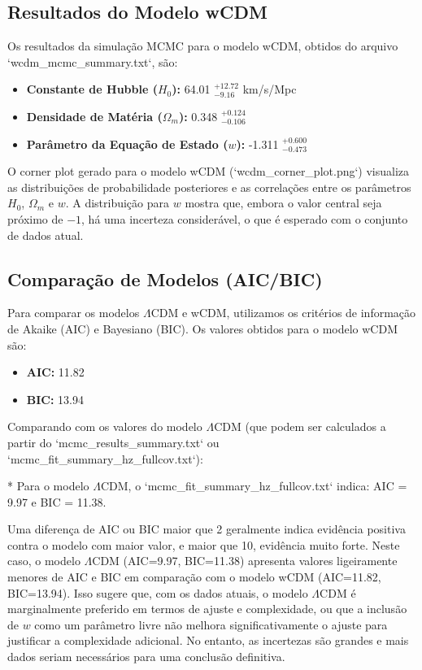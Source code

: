 \documentclass{article}
\begin{document}
\subsection{Resultados do Modelo wCDM}

Os resultados da simulação MCMC para o modelo wCDM, obtidos do arquivo `wcdm_mcmc_summary.txt`, são:

\begin{itemize}
    \item \textbf{Constante de Hubble ($H_0$):} 64.01 $^{+12.72}_{-9.16}$ km/s/Mpc
    \item \textbf{Densidade de Matéria ($\Omega_m$):} 0.348 $^{+0.124}_{-0.106}$
    \item \textbf{Parâmetro da Equação de Estado ($w$):} -1.311 $^{+0.600}_{-0.473}$
\end{itemize}

O corner plot gerado para o modelo wCDM (`wcdm_corner_plot.png`) visualiza as distribuições de probabilidade posteriores e as correlações entre os parâmetros $H_0$, $\Omega_m$ e $w$. A distribuição para $w$ mostra que, embora o valor central seja próximo de $-1$, há uma incerteza considerável, o que é esperado com o conjunto de dados atual.

\subsection{Comparação de Modelos (AIC/BIC)}

Para comparar os modelos $\Lambda$CDM e wCDM, utilizamos os critérios de informação de Akaike (AIC) e Bayesiano (BIC). Os valores obtidos para o modelo wCDM são:

\begin{itemize}
    \item \textbf{AIC:} 11.82
    \item \textbf{BIC:} 13.94
\end{itemize}

Comparando com os valores do modelo $\Lambda$CDM (que podem ser calculados a partir do `mcmc_results_summary.txt` ou `mcmc_fit_summary_hz_fullcov.txt`): 

*   Para o modelo $\Lambda$CDM, o `mcmc_fit_summary_hz_fullcov.txt` indica: AIC = 9.97 e BIC = 11.38.

Uma diferença de AIC ou BIC maior que 2 geralmente indica evidência positiva contra o modelo com maior valor, e maior que 10, evidência muito forte. Neste caso, o modelo $\Lambda$CDM (AIC=9.97, BIC=11.38) apresenta valores ligeiramente menores de AIC e BIC em comparação com o modelo wCDM (AIC=11.82, BIC=13.94). Isso sugere que, com os dados atuais, o modelo $\Lambda$CDM é marginalmente preferido em termos de ajuste e complexidade, ou que a inclusão de $w$ como um parâmetro livre não melhora significativamente o ajuste para justificar a complexidade adicional. No entanto, as incertezas são grandes e mais dados seriam necessários para uma conclusão definitiva.
\end{document}
